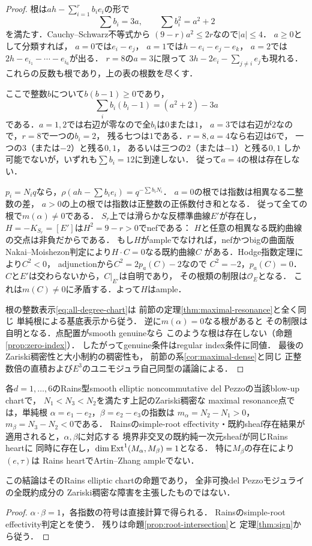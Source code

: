\begin{proof}
根は$a h-\sum_{i=1}^r b_ie_i$の形で
\[
 \sum b_i=3a,\qquad \sum b_i^2=a^2+2
\]
を満たす．Cauchy--Schwarz不等式から
$(9-r)a^2\le2r$なので$|a|\le4$．
$a\ge0$として分類すれば，
$a=0$では$e_i-e_j$，
$a=1$では$h-e_i-e_j-e_k$，
$a=2$では$2h-e_{i_1}-\cdots-e_{i_6}$が出る．
$r=8$の$a=3$に限って
$3h-2e_i-\sum_{j\ne i}e_j$も現れる．
これらの反数も根であり，上の表の根数を尽くす．

ここで整数$b$について$b(b-1)\ge0$であり，
\[
 \sum_i b_i(b_i-1)=(a^2+2)-3a
\]
である．$a=1,2$では右辺が零なので全$b_i$は$0$または$1$，
$a=3$では右辺が$2$なので，$r=8$で一つの$b_i=2$，
残る七つは$1$である．$r=8,a=4$なら右辺は$6$で，
一つの$3$（または$-2$）と残る$0,1$，
あるいは三つの$2$（または$-1$）と残る$0,1$
しか可能でないが，いずれも$\sum b_i=12$に到達しない．
従って$a=4$の根は存在しない．

$p_i=N_iq$なら，$\rho(a h-\sum b_ie_i)=q^{-\sum b_iN_i}$．
$a=0$の根では指数は相異なる二整数の差，
$a>0$の上の根では指数は正整数の正係数付き和となる．
従って全ての根で$m(\alpha)\ne0$である．
$S_r$上では滑らかな反標準曲線$E'$が存在し，
$H=-K_{S_r}=[E']$は$H^2=9-r>0$でnefである：
$H$と任意の相異なる既約曲線の交点は非負だからである．
もし$H$がampleでなければ，nefかつbigの曲面版
Nakai--Moishezon判定により$H\cdot C=0$なる既約曲線$C$
がある．Hodge指数定理により$C^2<0$，
adjunctionから$C^2=2p_a(C)-2$なので
$C^2=-2$，$p_a(C)=0$．
$C$と$E'$は交わらないから，$C|_{E'}$は自明であり，
その根類の制限は$\mathcal O_E$となる．
これは$m(C)\ne0$に矛盾する．よって$H$はample．

根の整数表示\eqref{eq:all-degree-chart}は
前節の定理\ref{thm:maximal-resonance}と全く同じ
単純根による基底表示から従う．
逆に$m(\alpha)=0$なる根があると
その制限は自明となる．点配置がsmooth genuineなら
このような根は存在しない（命題\ref{prop:zero-index}）．
したがってgenuine条件はregular index条件に同値．
最後のZariski稠密性と大小制約の稠密性も，
前節の系\ref{cor:maximal-dense}と同じ
正整数倍の直積および$E^3$のユニモジュラ自己同型の議論による．
\end{proof}

\begin{corollary}[各次数の実在混合根と反標準AZ障害]
\label{cor:all-degree-mixed}
各$d=1,\ldots,6$のRains型smooth elliptic
noncommutative del Pezzoの当該blow-up chartで，
$N_1<N_3<N_2$を満たす上記のZariski稠密な
maximal resonance点では，単純根
$\alpha=e_1-e_2$，$\beta=e_2-e_3$の指数は
$m_\alpha=N_2-N_1>0$，
$m_\beta=N_3-N_2<0$である．
Rainsのsimple-root effectivity・既約sheaf存在結果が
適用されると，$\alpha,\beta$に対応する
境界非交叉の既約純一次元sheafが同じRains heartに
同時に存在し，$\dim\operatorname{Ext}^1(M_\alpha,M_\beta)=1$となる．
特に$M_\beta$の存在により$(e,\tau)$は
Rains heartでArtin--Zhang ampleでない．

この結論はそのRains elliptic chartの命題であり，
全非可換del Pezzoモジュライの全既約成分の
Zariski稠密な障害を主張したものではない．
\end{corollary}
\begin{proof}
$\alpha\cdot\beta=1$，各指数の符号は直接計算で得られる．
Rains\cite[\S4]{RainsFiltered}のsimple-root
effectivity判定と\cite[\S\S9,11]{RainsBirational}を使う．
残りは命題\ref{prop:root-intersection}と
定理\ref{thm:sign}から従う．
\end{proof}
